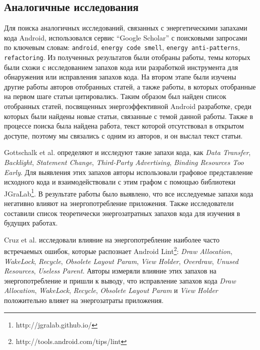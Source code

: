 \label{sec:relatedworks}


\subsection{Аналогичные исследования}


Для поиска аналогичных исследований, связанных с энергетическими запахами кода Android, использовался сервис “Google Scholar” с поисковыми запросами по ключевым словам: \texttt{android}, \texttt{energy code smell}, \texttt{energy anti-patterns}, \texttt{refactoring}. Из полученных результатов были отобраны работы, темы которых были схожи с исследованием запахов кода или разработкой инструмента для обнаружения или исправления запахов кода. На втором этапе были изучены другие работы авторов отобранных статей, а также работы, в которых отобранные на первом шаге статьи цитировались. Таким образом был найден список отобранных статей, посвященных энергоэффективной Android разработке, среди которых были найдены новые статьи, связанные с темой данной работы. Также в процессе поиска была найдена работа, текст которой отсутствовал в открытом доступе, поэтому мы связались с одним из авторов, и он выслал текст статьи.

Gottschalk et al. \cite{gottschalk2016refactorings} определяют и исследуют такие запахи кода, как \emph{Data Transfer}, \emph{Backlight}, \emph{Statement Change}, \emph{Third-Party Advertising}, \emph{Binding Resources Too Early}. Для выявления этих запахов авторы использовали графовое представление исходного кода и взаимодействовали с этим графом с помощью библиотеки JGraLab\footnote{http://jgralab.github.io/}. В результате работы было выявлено, что все исследуемые запахи кода негативно влияют на энергопотребление приложения. Также исследователи составили список теоретически энергозатратных запахов кода для изучения в будущих работах.

Cruz et al. \cite{cruz2017performance} исследовали влияние на энергопотребление наиболее часто встречаемых ошибок, которые распознает Android Lint\footnote{http://tools.android.com/tips/lint}: \emph{Draw Allocation}, \emph{WakeLock}, \emph{Recycle}, \emph{Obsolete Layout Param}, \emph{View Holder}, \emph{Over\-draw}, \emph{Unused Resources}, \emph{Useless Parent}. Авторы измеряли влияние этих запахов на энергопотребление и пришли к выводу, что исправление запахов кода \emph{Draw Allocation}, \emph{WakeLock}, \emph{Recycle}, \emph{Obsolete Layout Param} и \emph{View Holder} положительно влияет на энергозатраты приложения. 


